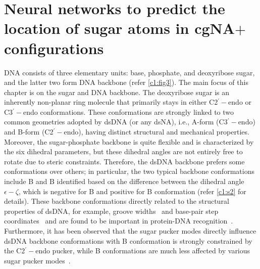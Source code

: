 \chapter{Neural networks to predict the location of sugar atoms in cgNA$+$ \hfill \linebreak configurations}\label{c7}

DNA consists of three elementary units: base, phosphate, and deoxyribose sugar, and the latter two form DNA backbone (refer \cref{c1:fig3}).
The main focus of this chapter is on the sugar and DNA backbone. 
The deoxyribose sugar is an inherently non-planar ring molecule that primarily stays in either C2$^\prime-$endo or C3$^\prime-$endo conformations.
These conformations are strongly linked to two common geometries adopted by dsDNA (or any dsNA), i.e., A-form (C3$^\prime-$endo) and B-form (C2$^\prime-$endo), having distinct structural and mechanical properties.
Moreover, the sugar-phosphate backbone is quite flexible and is characterized by the six dihedral parameters, but these dihedral angles are not entirely free to rotate due to steric constraints.
Therefore, the dsDNA backbone prefers some conformations over others; in particular, the two typical backbone conformations include B and B identified based on the difference between the dihedral angle $\epsilon-\zeta$, which is negative for B and positive for B conformation (refer \cref{c1:s2} for details).
These backbone conformations directly related to the structural properties of dsDNA, for example, groove widths~\cite{oguey2010understanding,heddi2010intrinsic} and base-pair step coordinates~\cite{drsata2013,packer1998sequence,pasi2014muabc,djuranovic2004dna} and are found to be important in protein-DNA recognition~\cite{gorenstein1994conformation,djuranovic2004dna}.
Furthermore, it has been observed that the sugar pucker modes directly influence dsDNA backbone conformations with B conformation is strongly constrained by the C2$^\prime-$endo pucker, while B conformations are much less affected by various sugar pucker modes~\cite{schneider1997conformations}.

